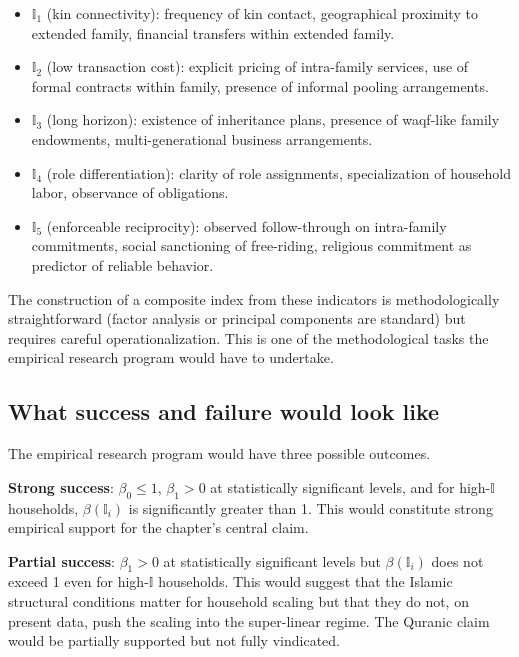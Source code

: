 \begin{itemize}[leftmargin=2em]
    \item $\mathbb{I}_1$ (kin connectivity): frequency of kin
    contact, geographical proximity to extended family, financial
    transfers within extended family.
    \item $\mathbb{I}_2$ (low transaction cost): explicit pricing of
    intra-family services, use of formal contracts within family,
    presence of informal pooling arrangements.
    \item $\mathbb{I}_3$ (long horizon): existence of inheritance
    plans, presence of waqf-like family endowments, multi-generational
    business arrangements.
    \item $\mathbb{I}_4$ (role differentiation): clarity of role
    assignments, specialization of household labor, observance of
     obligations.
    \item $\mathbb{I}_5$ (enforceable reciprocity): observed
    follow-through on intra-family commitments, social sanctioning
    of free-riding, religious commitment as predictor of reliable
    behavior.
\end{itemize}

The construction of a composite index from these indicators is
methodologically straightforward (factor analysis or principal
components are standard) but requires careful operationalization.
This is one of the methodological tasks the empirical research
program would have to undertake.

\subsection{What success and failure would look like}

The empirical research program would have three possible outcomes.

\textbf{Strong success}: $\beta_0 \leq 1$, $\beta_1 > 0$ at
statistically significant levels, and for high-$\mathbb{I}$
households, $\beta(\mathbb{I}_i)$ is significantly greater than 1.
This would constitute strong empirical support for the
chapter's central claim.

\textbf{Partial success}: $\beta_1 > 0$ at statistically
significant levels but $\beta(\mathbb{I}_i)$ does not exceed 1
even for high-$\mathbb{I}$ households. This would suggest that the
Islamic structural conditions matter for household scaling but
that they do not, on present data, push the scaling into the
super-linear regime. The Quranic claim would be partially supported
but not fully vindicated.

